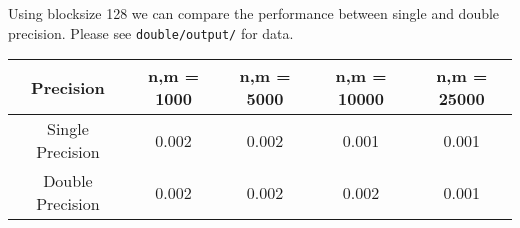 \documentclass[a4paper, fleqn]{article}
\begin{document}
Using blocksize 128 we can compare the performance between single and double precision. Please see \texttt{double/output/} for data. 


\begin{center}
 \begin{tabular}{||c | c | c | c | c ||}
 \hline
 Precision & n,m = 1000 & n,m = 5000 & n,m = 10000 & n,m = 25000 \\ [0.5ex] 
 \hline
 Single Precision & 0.002 & 0.002 & 0.001 & 0.001 \\
 \hline
 Double Precision & 0.002 & 0.002 & 0.002 & 0.001 \\
 \hline
 \hline
\end{tabular}
\end{center}
\end{document}

